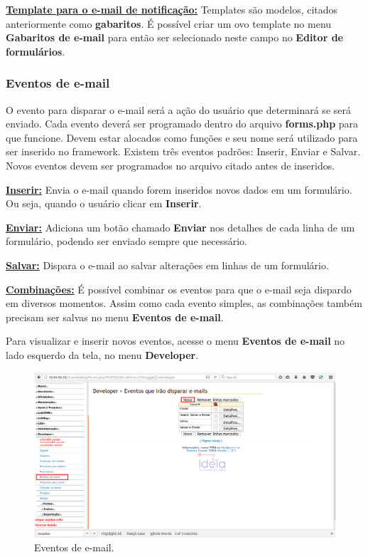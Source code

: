 \documentclass[9pt]{report}
\begin{document}
{      \underline{\textbf{Template para o e-mail de notificação:}}
      Templates são modelos, citados anteriormente como
      \textbf{gabaritos}. É possível criar um ovo template no menu
      \textbf{Gabaritos de e-mail} para então ser selecionado neste
      campo no \textbf{Editor de formulários}.
      
      \subsubsection{Eventos de e-mail}

      O evento para disparar o e-mail será a ação do usuário que
      determinará se será enviado. Cada evento deverá ser programado
      dentro do arquivo \textbf{forms.php} para que funcione. Devem
      estar alocados como funções e seu nome será utilizado para ser
      inserido no framework. Existem três eventos padrões: Inserir,
      Enviar e Salvar. Novos eventos devem ser programados no arquivo
      citado antes de inseridos.

      \underline{\textbf{Inserir:}} Envia o e-mail quando forem
      inseridos novos dados em um formulário. Ou seja, quando o
      usuário clicar em \textbf{Inserir}.
      
      \underline{\textbf{Enviar:}} Adiciona um botão chamado
      \textbf{Enviar} nos detalhes de cada linha de um formulário,
      podendo ser enviado sempre que necessário.
      
      \underline{\textbf{Salvar:}} Dispara o e-mail ao salvar
      alterações em linhas de um formulário.

      \underline{\textbf{Combinações:}} É possível combinar os
      eventos para que o e-mail seja dispardo em diversos momentos.
      Assim como cada evento simples, as combinações também precisam
      ser salvas no menu \textbf{Eventos de e-mail}.

      Para visualizar e inserir novos eventos, acesse o menu
      \textbf{Eventos de e-mail} no lado esquerdo da tela, no menu
      \textbf{Developer}.

      \begin{figure}[H]
        \includegraphics[width=\textwidth]{2_Formularios/6_Envio_de_email/55.png}
        \caption{Eventos de e-mail.}
        \label{fig:eventosemail}
      \end{figure}

}
\end{document}

